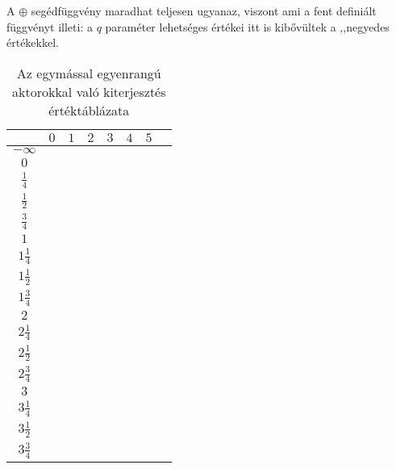 \documentclass{article}
\newcommand{\blk}{\cellcolor{darkgray}}
\newcommand{\red}{\cellcolor{red!33}}
\newcommand{\grn}{\cellcolor{green!33}}
\newcommand{\nothing}{\text{\raisebox{0.4em}{\rotatebox{180}{$\curvearrowleft$}}}}%
\newcommand{\just}[1]{\boxed{#1}}%
\newcommand{\incl}{\mathbf{incl}}
\newcommand{\excl}{\mathbf{excl}}
\begin{document}
	A $\oplus$ segédfüggvény maradhat teljesen ugyanaz, viszont ami a fent definiált függvényt illeti: a $q$ paraméter lehetséges értékei itt is kibővültek a ,,negyedes értékekkel.

	\begin{table}[H]
		\caption*{Az egymással egyenrangú aktorokkal való kiterjesztés értéktáblázata}
		\centering
		\begin{tabular}{c||c|c|c|c|c|c|c|}
				&	$0$		&	$1$		&	$2$		&	$3$		&	$4$		&	$5$		\\\hline\hline
		$-\infty$	&	\nothing	&	\nothing	&	\nothing	&	\nothing	&	\nothing	&	\nothing	\\\hline
			$0$	&	\nothing	&	\nothing	&	\nothing	&	\nothing	&	\nothing	&	\grn\just\incl	\\\hline
		$\frac14$	&	\nothing	&	\nothing	&	\nothing	&	\nothing	&	\nothing	&	\grn\just\incl	\\\hline
		$\frac12$	&	\red\just\excl	&	\nothing	&	\nothing	&	\nothing	&	\nothing	&	\grn\just\incl	\\\hline
		$\frac34$	&	\red\just\excl	&	\nothing	&	\nothing	&	\nothing	&	\nothing	&	\grn\just\incl	\\\hline
			$1$	&	\red\just\excl	&	\nothing	&	\nothing	&	\nothing	&	\grn\just\incl	&	\blk		\\\hline
		$1\frac14$	&	\red\just\excl	&	\nothing	&	\nothing	&	\nothing	&	\grn\just\incl	&	\blk		\\\hline
		$1\frac12$	&	\blk		&	\red\just\excl	&	\nothing	&	\nothing	&	\grn\just\incl	&	\blk		\\\hline
		$1\frac34$	&	\blk		&	\red\just\excl	&	\nothing	&	\nothing	&	\grn\just\incl	&	\blk		\\\hline
			$2$	&	\blk		&	\red\just\excl	&	\nothing	&	\grn\just\incl	&	\blk		&	\blk		\\\hline
		$2\frac14$	&	\blk		&	\red\just\excl	&	\nothing	&	\grn\just\incl	&	\blk		&	\blk		\\\hline
		$2\frac12$	&	\blk		&	\blk		&	\red\just\excl	&	\grn\just\incl	&	\blk		&	\blk		\\\hline
		$2\frac34$	&	\blk		&	\blk		&	\red\just\excl	&	\grn\just\incl	&	\blk		&	\blk		\\\hline
			$3$	&	\blk		&	\blk		&	\blk		&	\blk		&	\blk		&	\blk		\\\hline
		$3\frac14$	&	\blk		&	\blk		&	\blk		&	\blk		&	\blk		&	\blk		\\\hline
		$3\frac12$	&	\blk		&	\blk		&	\blk		&	\blk		&	\blk		&	\blk		\\\hline
		$3\frac34$	&	\blk		&	\blk		&	\blk		&	\blk		&	\blk		&	\blk		\\\hline
		\end{tabular}
	\end{table}
\end{document}
